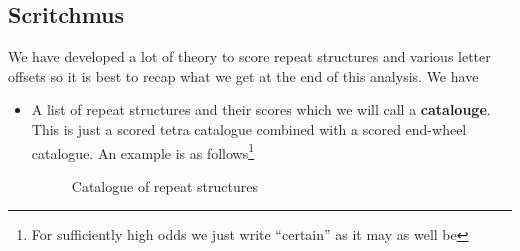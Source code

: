   \subsection{Scritchmus}
  We have developed a lot of theory to score repeat structures and
  various letter offsets so it is best to recap what we get at the
  end of this analysis. We have
  \begin{itemize}
    \item A list of repeat structures and their scores which we will
      call a {\bf{catalouge}}. This is just a scored tetra catalogue
      combined with a scored end-wheel catalogue. An example is as
      follows\footnote{For sufficiently high odds we just write
      ``certain'' as it may as well be}
      \begin{figure}[H]

        \begin{center}
        \end{center}
        \caption{Catalogue of repeat structures}
        \label{fig:catalogue}

\end{figure}
\end{itemize}
